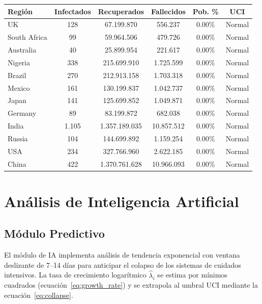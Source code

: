 \documentclass[12pt,a4paper]{article}
\begin{document}
\begin{center}
\begin{tabular}{lccccc}
\toprule
\textbf{Región} & \textbf{Infectados} & \textbf{Recuperados} & \textbf{Fallecidos} & \textbf{Pob. \%} & \textbf{UCI} \\
\midrule
        UK & 128 & 67.199.870 & 556.237 & 0.00\% & \cellcolor{green!15}Normal \\
        South Africa & 99 & 59.964.506 & 479.726 & 0.00\% & \cellcolor{green!15}Normal \\
        Australia & 40 & 25.899.954 & 221.617 & 0.00\% & \cellcolor{green!15}Normal \\
        Nigeria & 338 & 215.699.910 & 1.725.599 & 0.00\% & \cellcolor{green!15}Normal \\
        Brazil & 270 & 212.913.158 & 1.703.318 & 0.00\% & \cellcolor{green!15}Normal \\
        Mexico & 161 & 130.199.837 & 1.042.737 & 0.00\% & \cellcolor{green!15}Normal \\
        Japan & 141 & 125.699.852 & 1.049.871 & 0.00\% & \cellcolor{green!15}Normal \\
        Germany & 89 & 83.199.872 & 682.038 & 0.00\% & \cellcolor{green!15}Normal \\
        India & 1.105 & 1.357.189.035 & 10.857.512 & 0.00\% & \cellcolor{green!15}Normal \\
        Russia & 104 & 144.699.892 & 1.159.254 & 0.00\% & \cellcolor{green!15}Normal \\
        USA & 234 & 327.766.960 & 2.622.185 & 0.00\% & \cellcolor{green!15}Normal \\
        China & 422 & 1.370.761.628 & 10.966.093 & 0.00\% & \cellcolor{green!15}Normal \\

\bottomrule
\end{tabular}
\end{center}

\section{Análisis de Inteligencia Artificial}

\subsection{Módulo Predictivo}

El módulo de IA implementa análisis de tendencia exponencial con ventana deslizante
de 7–14 días para anticipar el colapso de los sistemas de cuidados intensivos.
La tasa de crecimiento logarítmico $\hat{\lambda}_i$ se estima por mínimos cuadrados
(ecuación~\eqref{eq:growth_rate}) y se extrapola al umbral UCI mediante
la ecuación~\eqref{eq:collapse}.
\end{document}
